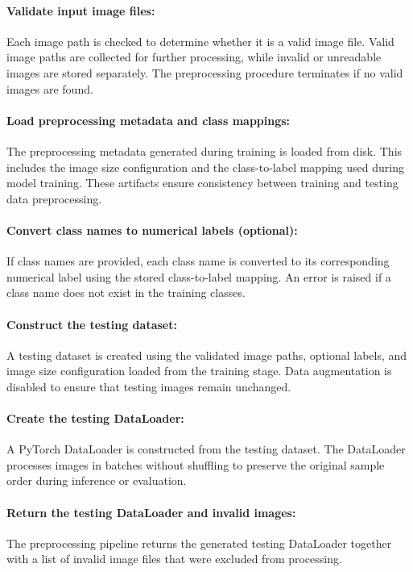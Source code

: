 \paragraph{Validate input image files:}\par
Each image path is checked to determine whether it is a valid image file. Valid image paths are collected for further processing, while invalid or unreadable images are stored separately. The preprocessing procedure terminates if no valid images are found.

\vspace{1cm}
\paragraph{Load preprocessing metadata and class mappings:}\par
The preprocessing metadata generated during training is loaded from disk. This includes the image size configuration and the class-to-label mapping used during model training. These artifacts ensure consistency between training and testing data preprocessing.

\vspace{1cm}
\paragraph{Convert class names to numerical labels (optional):}\par
If class names are provided, each class name is converted to its corresponding numerical label using the stored class-to-label mapping. An error is raised if a class name does not exist in the training classes.

\vspace{1cm}
\paragraph{Construct the testing dataset:}\par
A testing dataset is created using the validated image paths, optional labels, and image size configuration loaded from the training stage. Data augmentation is disabled to ensure that testing images remain unchanged.

\vspace{1cm}
\paragraph{Create the testing DataLoader:}\par
A PyTorch DataLoader is constructed from the testing dataset. The DataLoader processes images in batches without shuffling to preserve the original sample order during inference or evaluation.

\vspace{1cm}
\paragraph{Return the testing DataLoader and invalid images:}\par
The preprocessing pipeline returns the generated testing DataLoader together with a list of invalid image files that were excluded from processing.